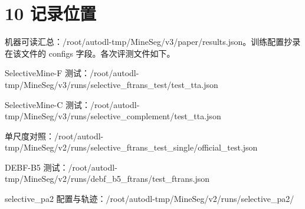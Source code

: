 \documentclass[11pt]{article}
\begin{document}
\section*{10 记录位置}
机器可读汇总：/\allowbreak root/\allowbreak autodl-tmp/\allowbreak MineSeg/\allowbreak v3/\allowbreak paper/\allowbreak results.json。训练配置抄录在该文件的 configs 字段。各次评测文件如下。

SelectiveMine-F 测试：/\allowbreak root/\allowbreak autodl-tmp/\allowbreak MineSeg/\allowbreak v3/\allowbreak runs/\allowbreak selective\_\allowbreak ftrans\_\allowbreak test/\allowbreak test\_\allowbreak tta.json

SelectiveMine-C 测试：/\allowbreak root/\allowbreak autodl-tmp/\allowbreak MineSeg/\allowbreak v3/\allowbreak runs/\allowbreak selective\_\allowbreak complement/\allowbreak test\_\allowbreak tta.json

单尺度对照：/\allowbreak root/\allowbreak autodl-tmp/\allowbreak MineSeg/\allowbreak v2/\allowbreak runs/\allowbreak selective\_\allowbreak ftrans\_\allowbreak test\_\allowbreak single/\allowbreak official\_\allowbreak test.json

DEBF-B5 测试：/\allowbreak root/\allowbreak autodl-tmp/\allowbreak MineSeg/\allowbreak v2/\allowbreak runs/\allowbreak debf\_\allowbreak b5\_\allowbreak ftrans/\allowbreak test\_\allowbreak ftrans.json

selective\_\allowbreak pa2 配置与轨迹：/\allowbreak root/\allowbreak autodl-tmp/\allowbreak MineSeg/\allowbreak v2/\allowbreak runs/\allowbreak selective\_\allowbreak pa2/\allowbreak 
\end{document}
